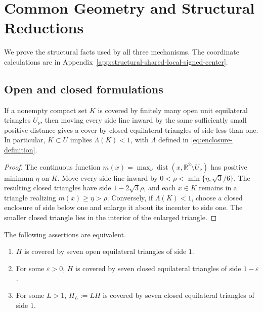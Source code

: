 \section{Common Geometry and Structural Reductions}
\label{sec:structure-common}
\label{sec:structural-reductions}

We prove the structural facts used by all three mechanisms. The coordinate
calculations are in Appendix~\ref{app:structural-shared-local-signed-center}.

\subsection{Open and closed formulations}

\begin{lemma}
\label{lem:compact-cover-margin}
If a nonempty compact set $K$ is covered by finitely many open unit equilateral
triangles $U_\nu$, then moving every side line inward by the same sufficiently
small positive distance gives a cover by closed equilateral triangles of
side less than one. In particular, $K\subset U$ implies $\Lambda(K)<1$,
with $\Lambda$ defined in \eqref{eq:enclosure-definition}.
\end{lemma}
\begin{proof}
The continuous function
$m(x)=\max_\nu\operatorname{dist}(x,\mathbb R^2\setminus U_\nu)$
has positive minimum $\eta$ on $K$. Move every side line inward by
$0<\rho<\min\{\eta,\sqrt3/6\}$. The resulting closed triangles have
side $1-2\sqrt3\rho$, and each $x\in K$ remains in a triangle realizing
$m(x)\ge\eta>\rho$. Conversely, if $\Lambda(K)<1$, choose a closed
enclosure of side below one and enlarge it about its incenter to side one.
The smaller closed triangle lies in the interior of the enlarged triangle.
\end{proof}

\begin{proposition}
\label{prop:open-closed-scaled}
The following assertions are equivalent.
\begin{enumerate}
 \item $H$ is covered by seven open equilateral triangles of side $1$.
 \item For some $\varepsilon>0$, $H$ is covered by seven closed equilateral
 triangles of side $1-\varepsilon$.
 \item For some $L>1$, $H_L:=LH$ is covered by seven closed equilateral
 triangles of side $1$.
\end{enumerate}
\end{proposition}

